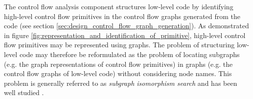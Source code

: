 
The control flow analysis component structures low-level code by identifying high-level control flow primitives in the control flow graphs generated from the code (see section \ref{sec:design_control_flow_graph_generation}). As demonstrated in figure \ref{fig:representation_and_identification_of_primitive}, high-level control flow primitives may be represented using graphs. The problem of structuring low-level code may therefore be reformulated as the problem of locating subgraphs (e.g. the graph representations of control flow primitives) in graphs (e.g. the control flow graphs of low-level code) without considering node names. This problem is generally referred to as \textit{subgraph isomorphism search} and has been well studied \cite{subgraph_isomorphism_algorithms}.

